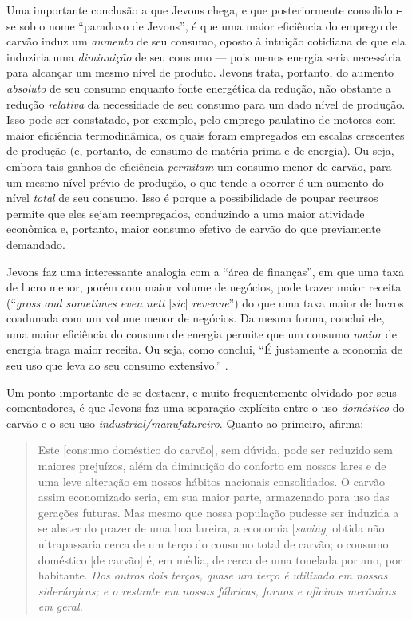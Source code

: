 Uma importante conclusão a que Jevons chega, e que posteriormente consolidou-se sob o nome ``paradoxo de Jevons'', é que uma maior eficiência do emprego de carvão induz um \textit{aumento} de seu consumo, oposto à intuição cotidiana de que ela induziria uma \textit{diminuição} de seu consumo --- pois menos energia seria necessária para alcançar um mesmo nível de produto. 
Jevons trata, portanto, do aumento \textit{absoluto} de seu consumo enquanto fonte energética da redução, não obstante a redução \textit{relativa} da necessidade de seu consumo para um dado nível de produção. Isso pode ser constatado, por exemplo, pelo emprego paulatino de motores com maior eficiência termodinâmica, os quais foram empregados em escalas crescentes de produção (e, portanto, de consumo de matéria-prima e de energia). Ou seja, embora tais ganhos de eficiência \textit{permitam} um consumo menor de carvão, para um mesmo nível prévio de produção, o que tende a ocorrer é um aumento do nível \textit{total} de seu consumo. Isso é porque a possibilidade de poupar recursos permite que eles sejam reempregados, conduzindo a uma maior atividade econômica e, portanto, maior consumo efetivo de carvão do que previamente demandado. 

Jevons faz uma interessante analogia com a ``área de finanças'', em que uma taxa de lucro menor, porém com maior volume de negócios, pode trazer maior receita (``\textit{gross and sometimes even nett} [\textit{sic}] \textit{revenue}'') do que uma taxa maior de lucros coadunada com um volume menor de negócios. Da mesma forma, conclui ele, uma maior eficiência do consumo de energia permite que um consumo \textit{maior} de energia traga maior receita. Ou seja, como conclui, ``É justamente a economia de seu uso que leva ao seu consumo extensivo.'' \cite[p. 76]{Jevons1866}. 

Um ponto importante de se destacar, e muito frequentemente olvidado por seus comentadores, é que Jevons faz uma separação explícita entre o uso \textit{doméstico} do carvão e o seu uso \textit{industrial/manufatureiro}. Quanto ao primeiro, afirma:
\begin{quote}
    Este [consumo doméstico do carvão], sem dúvida, pode ser reduzido sem maiores prejuízos, além da diminuição do conforto em nossos lares e de uma leve alteração em nossos hábitos nacionais consolidados. O carvão assim economizado seria, em sua maior parte, armazenado para uso das gerações futuras. Mas mesmo que nossa população pudesse ser induzida a se abster do prazer de uma boa lareira, a economia [\textit{saving}] obtida não ultrapassaria cerca de um terço do consumo total de carvão; o consumo doméstico [de carvão] é, em média, de cerca de uma tonelada por ano, por habitante. \textit{Dos outros dois terços, quase um terço é utilizado em nossas siderúrgicas; e o restante em nossas fábricas, fornos e oficinas mecânicas em geral.} \cite[p. 75, grifo meu]{Jevons1866}
\end{quote}

